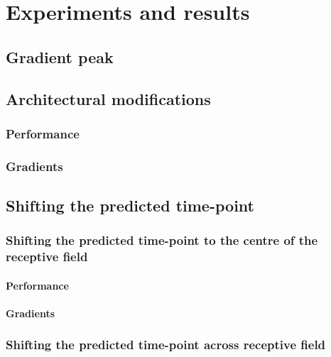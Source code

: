 \chapter{Experiments and results}
\label{ch:exp}

\section{Gradient peak}\label{sec:gradient-peak}


\section{Architectural modifications}\label{sec:architectural-modifications}

\subsection{Performance}\label{subsec:performance}

\subsection{Gradients}\label{subsec:gradients}


\section{Shifting the predicted time-point}\label{sec:shifting-the-predicted-time-point}

\subsection{Shifting the predicted time-point to the centre of the receptive field}\label{subsec:shifting-the-predicted-time-point-to-the-centre-of-the-receptive-field}

\subsubsection{Performance}
\subsubsection{Gradients}
\subsection{Shifting the predicted time-point across receptive field}\label{subsec:shifting-the-predicted-time-point-across-receptive-field}

